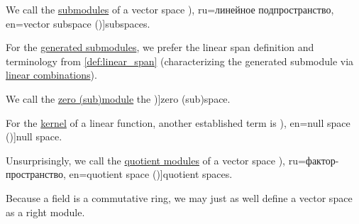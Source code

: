 \begin{definition}
\begin{thmenum}
    \medskip

     We call the \hyperref[def:module/subobject]{submodules} of a vector space \term[bg=подпространство (\cite[101]{Обрешков1962ВисшаАлгебра}), ru=линейное подпространство, en=vector subspace (\cite[17]{FriedbergInselSpence2018LinearAlgebra})]{subspaces}.

     For the \hyperref[def:module/generated]{generated submodules}, we prefer the linear span definition and terminology from \cref{def:linear_span} (characterizing the generated submodule via \hyperref[def:linear_combination]{linear combinations}).

     We call the \hyperref[def:module/trivial]{zero (sub)module} the \term[ru=нулевое подпространство, en=zero subspace (\cite[17]{FriedbergInselSpence2018LinearAlgebra})]{zero (sub)space}.

     For the \hyperref[def:module/kernel]{kernel} of a linear function, another established term is \term[ru=нуль-пространство (матрицы) (\cite[112]{Тыртышников2007ЛинейнаяАлгебра}), en=null space (\cite[67]{FriedbergInselSpence2018LinearAlgebra})]{null space}.

     Unsurprisingly, we call the \hyperref[def:module/quotient]{quotient modules} of a vector space \term[bg=фактор-пространство (\cite[308]{ГеновМиховскиМоллов1991Алгебра}), ru=фактор-пространство, en=quotient space (\cite[exerc. 1.3.31(d)]{FriedbergInselSpence2018LinearAlgebra})]{quotient spaces}.
  \end{thmenum}
\end{definition}
\begin{comments}
  \item Because a field is a commutative ring, we may just as well define a vector space as a right module.
\end{comments}


